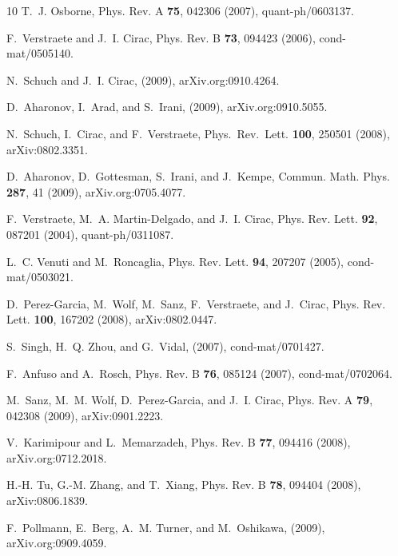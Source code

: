 \documentclass{article}
\theoremstyle{plain}
\theoremstyle{definition}
\numberwithin{equation}{section}  %
\begin{document}
\begin{thebibliography}{10}
    T.~J. Osborne,
    \newblock Phys. Rev. A {\bf 75}, 042306 (2007), quant-ph/0603137.

    F.~Verstraete and J.~I. Cirac,
    \newblock Phys. Rev. B {\bf 73}, 094423 (2006), cond-mat/0505140.

    N.~Schuch and J.~I. Cirac,
    \newblock (2009), arXiv.org:0910.4264.

    D.~Aharonov, I.~Arad, and S.~Irani,
    \newblock (2009), arXiv.org:0910.5055.

    N.~Schuch, I.~Cirac, and F.~Verstraete,
    \newblock Phys.\ Rev.\ Lett. {\bf 100}, 250501 (2008), arXiv:0802.3351.

    D.~Aharonov, D.~Gottesman, S.~Irani, and J.~Kempe,
    \newblock Commun. Math. Phys. {\bf 287}, 41 (2009), arXiv.org:0705.4077.

    F.~Verstraete, M.~A. Martin-Delgado, and J.~I. Cirac,
    \newblock Phys. Rev. Lett. {\bf 92}, 087201 (2004), quant-ph/0311087.

    L.~C. Venuti and M.~Roncaglia,
    \newblock Phys. Rev. Lett. {\bf 94}, 207207 (2005), cond-mat/0503021.

    D.~Perez-Garcia, M.~Wolf, M.~Sanz, F.~Verstraete, and J.~Cirac,
    \newblock Phys. Rev. Lett. {\bf 100}, 167202 (2008), arXiv:0802.0447.

    S.~Singh, H.~Q. Zhou, and G.~Vidal,
    \newblock (2007), cond-mat/0701427.

    F.~Anfuso and A.~Rosch,
    \newblock Phys. Rev. B {\bf 76}, 085124 (2007), cond-mat/0702064.

    M.~Sanz, M.~M. Wolf, D.~Perez-Garcia, and J.~I. Cirac,
    \newblock Phys. Rev. A {\bf 79}, 042308 (2009), arXiv:0901.2223.

    V.~Karimipour and L.~Memarzadeh,
    \newblock Phys. Rev. B {\bf 77}, 094416 (2008), arXiv.org:0712.2018.

    H.-H. Tu, G.-M. Zhang, and T.~Xiang,
    \newblock Phys. Rev. B {\bf 78}, 094404 (2008), arXiv:0806.1839.

    F.~Pollmann, E.~Berg, A.~M. Turner, and M.~Oshikawa,
    \newblock (2009), arXiv.org:0909.4059.


\end{thebibliography}
\end{document}
